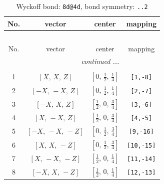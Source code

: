 \documentclass[fleqn,8pt]{jsarticle}
\begin{document}
\begin{longtable}{cccc}
\caption{Wyckoff bond: {\tt 8d@4d}, bond symmetry: {\tt ..2}}
 \\
 \hline \hline
No. & vector & center & mapping \\ \hline \endfirsthead

\multicolumn{3}{l}{\tablename\ \thetable{}} \\
 \hline \hline
No. & vector & center & mapping \\ \hline \endhead

 \hline \hline
\multicolumn{3}{r}{\footnotesize\it continued ...} \\ \endfoot

 \hline \hline
\multicolumn{3}{r}{} \\ \endlastfoot

1 & $\left[ X,\, X,\, Z \right]$ & $\left[ 0,\, \frac{1}{2},\, \frac{1}{4} \right]$ & {\tt [1,-8]} \\ \hline
2 & $\left[ - X,\, - X,\, Z \right]$ & $\left[ 0,\, \frac{1}{2},\, \frac{1}{4} \right]$ & {\tt [2,-7]} \\ \hline
3 & $\left[ - X,\, X,\, Z \right]$ & $\left[ \frac{1}{2},\, 0,\, \frac{3}{4} \right]$ & {\tt [3,-6]} \\ \hline
4 & $\left[ X,\, - X,\, Z \right]$ & $\left[ \frac{1}{2},\, 0,\, \frac{3}{4} \right]$ & {\tt [4,-5]} \\ \hline
5 & $\left[ - X,\, - X,\, - Z \right]$ & $\left[ 0,\, \frac{1}{2},\, \frac{3}{4} \right]$ & {\tt [9,-16]} \\ \hline
6 & $\left[ X,\, X,\, - Z \right]$ & $\left[ 0,\, \frac{1}{2},\, \frac{3}{4} \right]$ & {\tt [10,-15]} \\ \hline
7 & $\left[ X,\, - X,\, - Z \right]$ & $\left[ \frac{1}{2},\, 0,\, \frac{1}{4} \right]$ & {\tt [11,-14]} \\ \hline
8 & $\left[ - X,\, X,\, - Z \right]$ & $\left[ \frac{1}{2},\, 0,\, \frac{1}{4} \right]$ & {\tt [12,-13]} \\
\end{longtable}
\renewcommand{\arraystretch}{1.2}
\end{document}

